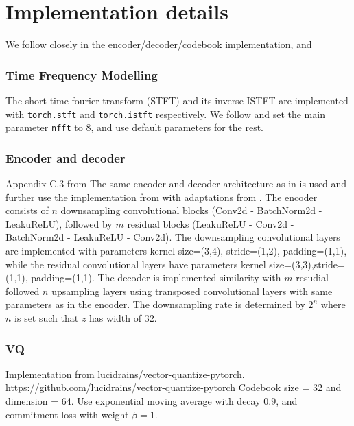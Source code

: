 \documentclass[../../thesis.tex]{subfiles}
\begin{document}
\section{Implementation details}
We follow \cite{TimeVQVAE} closely in the encoder/decoder/codebook implementation, and 

\subsubsection{Time Frequency Modelling}
The short time fourier transform (STFT) and its inverse ISTFT are implemented with \texttt{torch.stft} and \texttt{torch.istft} respectively. We follow \cite{TimeVQVAE} and set the main parameter \texttt{nfft} to $8$, and use default parameters for the rest.\newline


\subsubsection{Encoder and decoder}
Appendix C.3 from \cite{TimeVQVAE}\newline
The same encoder and decoder architecture as in \cite{VQVAE} is used and further use the implementation from \cite{nadavbh12} with adaptations from \cite{TimeVQVAE}.\newline
The encoder consists of $n$ downsampling convolutional blocks (Conv2d - BatchNorm2d - LeakuReLU), followed by $m$ residual blocks (LeakuReLU - Conv2d - BatchNorm2d - LeakuReLU - Conv2d). The downsampling convolutional layers are implemented with parameters {kernel size=(3,4),
stride=(1,2), padding=(1,1)}, while the residual convolutional layers have parameters  {kernel size=(3,3),stride=(1,1), padding=(1,1)}.\newline
The decoder is implemented similarity with $m$ resudial followed $n$ upsampling layers using transposed convolutional layers with same parameters as in the encoder. \newline
The downsampling rate is determined by $2^n$ where $n$ is set such that $z$ has width of $32$.

\subsubsection{VQ}
Implementation from lucidrains/vector-quantize-pytorch. https://github.com/lucidrains/vector-quantize-pytorch \newline
Codebook size = 32 and dimension = 64. \newline
Use exponential moving average with decay $0.9$, and commitment loss with weight $\beta = 1$.
\end{document}
